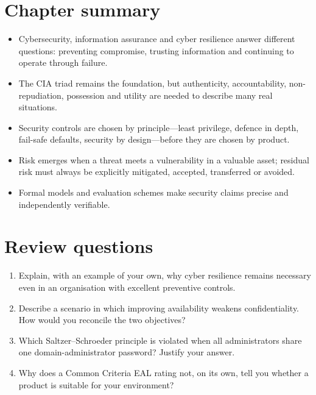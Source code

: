 \documentclass[11pt,openany]{book}
\begin{document}
\section*{Chapter summary}
\begin{itemize}
  \item Cybersecurity, information assurance and cyber resilience answer different questions: preventing compromise, trusting information and continuing to operate through failure.
  \item The CIA triad remains the foundation, but authenticity, accountability, non-repudiation, possession and utility are needed to describe many real situations.
  \item Security controls are chosen by principle—least privilege, defence in depth, fail-safe defaults, security by design—before they are chosen by product.
  \item Risk emerges when a threat meets a vulnerability in a valuable asset; residual risk must always be explicitly mitigated, accepted, transferred or avoided.
  \item Formal models and evaluation schemes make security claims precise and independently verifiable.
\end{itemize}

\section*{Review questions}
\begin{enumerate}
  \item Explain, with an example of your own, why cyber resilience remains necessary even in an organisation with excellent preventive controls.
  \item Describe a scenario in which improving availability weakens confidentiality. How would you reconcile the two objectives?
  \item Which Saltzer–Schroeder principle is violated when all administrators share one domain-administrator password? Justify your answer.
  \item Why does a Common Criteria EAL rating not, on its own, tell you whether a product is suitable for your environment?
\end{enumerate}

\end{document}
